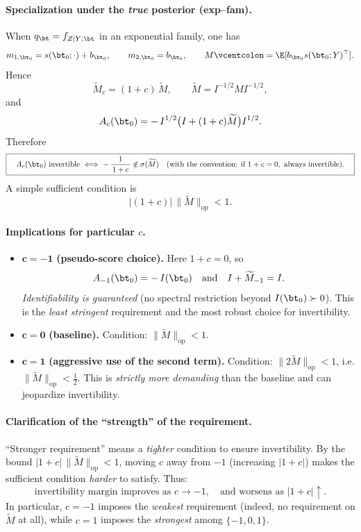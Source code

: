 {\paragraph{Specialization under the \emph{true} posterior (exp–fam).}
When \(q_\bt=f_{Z\mid Y;\bt}\) in an exponential family, one has
\[
m_{1,\bt_0}=s(\bt_0;\cdot)+b_{\bt_0},\qquad m_{2,\bt_0}=b_{\bt_0},
\qquad M\vcentcolon=\E[b_{\bt_0}s(\bt_0;Y)^\top].
\]
Hence
\[
\widetilde M_c=(1+c)\,\widetilde M,\qquad \widetilde M=I^{-1/2}MI^{-1/2},
\]
and
\[
A_c(\bt_0)=-\,I^{1/2}\big(I+(1+c)\widetilde M\big)I^{1/2}.
\]
Therefore
\[
\boxed{\quad
A_c(\bt_0)\ \text{invertible}
\ \Longleftrightarrow\ 
-\,\frac{1}{\,1+c\,}\notin \sigma(\widetilde M)
\quad(\text{with the convention: if }1+c=0,\ \text{always invertible}).
\quad}
\]
A simple sufficient condition is
\[
\boxed{\quad
|(1+c)|\,\|\widetilde M\|_{\mathrm{op}}<1.
\quad}
\]

\paragraph{Implications for particular \(c\).}
\begin{itemize}
\item \(\boldsymbol{c=-1}\) \textbf{(pseudo-score choice).} Here \(1+c=0\), so
\[
A_{-1}(\bt_0)=-\,I(\bt_0)\quad\text{and}\quad I+\widetilde M_{-1}=I.
\]
\emph{Identifiability is guaranteed} (no spectral restriction beyond \(I(\bt_0)\succ0\)).  
This is the \emph{least stringent} requirement and the most robust choice for invertibility.
\item \(\boldsymbol{c=0}\) \textbf{(baseline).} Condition: \(\|\widetilde M\|_{\mathrm{op}}<1\).
\item \(\boldsymbol{c=1}\) \textbf{(aggressive use of the second term).} Condition: \(\|2\widetilde M\|_{\mathrm{op}}<1\), i.e. \(\|\widetilde M\|_{\mathrm{op}}<\tfrac12\).  
This is \emph{strictly more demanding} than the baseline and can jeopardize invertibility.
\end{itemize}

\paragraph{Clarification of the “strength” of the requirement.}
“Stronger requirement” means a \emph{tighter} condition to ensure invertibility.  
By the bound \( |1+c|\,\|\widetilde M\|_{\mathrm{op}}<1\), moving \(c\) away from \(-1\) (increasing \(|1+c|\)) makes the sufficient condition \emph{harder} to satisfy.  
Thus:
\[
\text{invertibility margin improves as } c\to -1,\quad
\text{and worsens as } |1+c| \uparrow .
\]
In particular, \(c=-1\) imposes the \emph{weakest} requirement (indeed, no requirement on \(\widetilde M\) at all), while \(c=1\) imposes the \emph{strongest} among \(\{-1,0,1\}\).

}
